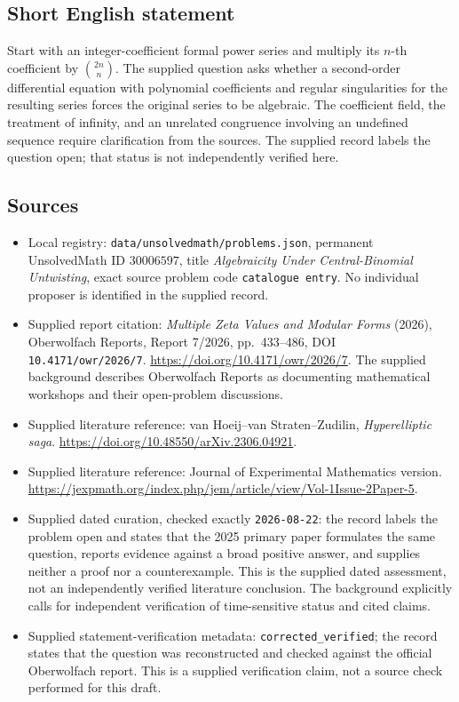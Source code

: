 \documentclass[11pt]{article}
\begin{document}
\subsection{Short English statement}
Start with an integer-coefficient formal power series and multiply its \(n\)-th coefficient by \(\binom{2n}{n}\). The supplied question asks whether a second-order differential equation with polynomial coefficients and regular singularities for the resulting series forces the original series to be algebraic. The coefficient field, the treatment of infinity, and an unrelated congruence involving an undefined sequence require clarification from the sources. The supplied record labels the question open; that status is not independently verified here.
\subsection{Sources}
\begin{itemize}
\item Local registry: \texttt{data/unsolvedmath/problems.json}, permanent UnsolvedMath ID \(30006597\), title \emph{Algebraicity Under Central-Binomial Untwisting}, exact source problem code \texttt{catalogue entry}. No individual proposer is identified in the supplied record.
\item Supplied report citation: \emph{Multiple Zeta Values and Modular Forms} (2026), Oberwolfach Reports, Report 7/2026, pp.\ 433--486, DOI \texttt{10.4171/owr/2026/7}. \url{https://doi.org/10.4171/owr/2026/7}. The supplied background describes Oberwolfach Reports as documenting mathematical workshops and their open-problem discussions.
\item Supplied literature reference: van Hoeij--van Straten--Zudilin, \emph{Hyperelliptic saga}. \url{https://doi.org/10.48550/arXiv.2306.04921}.
\item Supplied literature reference: Journal of Experimental Mathematics version. \url{https://jexpmath.org/index.php/jem/article/view/Vol-1Issue-2Paper-5}.
\item Supplied dated curation, checked exactly \texttt{2026-08-22}: the record labels the problem open and states that the 2025 primary paper formulates the same question, reports evidence against a broad positive answer, and supplies neither a proof nor a counterexample. This is the supplied dated assessment, not an independently verified literature conclusion. The background explicitly calls for independent verification of time-sensitive status and cited claims.
\item Supplied statement-verification metadata: \texttt{corrected\_verified}; the record states that the question was reconstructed and checked against the official Oberwolfach report. This is a supplied verification claim, not a source check performed for this draft.
\end{itemize}
\end{document}
